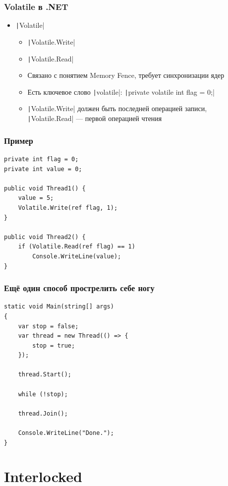 \documentclass{../../slides-style}
\begin{document}
    \begin{frame}
        \frametitle{Volatile в .NET}
        \begin{itemize}
            \item \texttt|Volatile|
            \begin{itemize}
                \item \texttt|Volatile.Write|
                \item \texttt|Volatile.Read|
                \item Связано с понятием Memory Fence, требует синхронизации ядер
                \item Есть ключевое слово \texttt|volatile|: \texttt|private volatile int flag = 0;|
                \item \texttt|Volatile.Write| должен быть последней операцией записи, \texttt|Volatile.Read| --- первой операцией чтения
            \end{itemize}
        \end{itemize}
    \end{frame}

    \begin{frame}[fragile]
        \frametitle{Пример}
        \begin{verbatim}
private int flag = 0;
private int value = 0;

public void Thread1() {
    value = 5;
    Volatile.Write(ref flag, 1);
}

public void Thread2() {
    if (Volatile.Read(ref flag) == 1)
        Console.WriteLine(value);
}
        \end{verbatim}
    \end{frame}

    \begin{frame}[fragile]
        \frametitle{Ещё один способ прострелить себе ногу}
        \begin{verbatim}
static void Main(string[] args)
{
    var stop = false;
    var thread = new Thread(() => {
        stop = true;
    });

    thread.Start();

    while (!stop);

    thread.Join();

    Console.WriteLine("Done.");
}
        \end{verbatim}
    \end{frame}

    \section{Interlocked}
\end{document}
